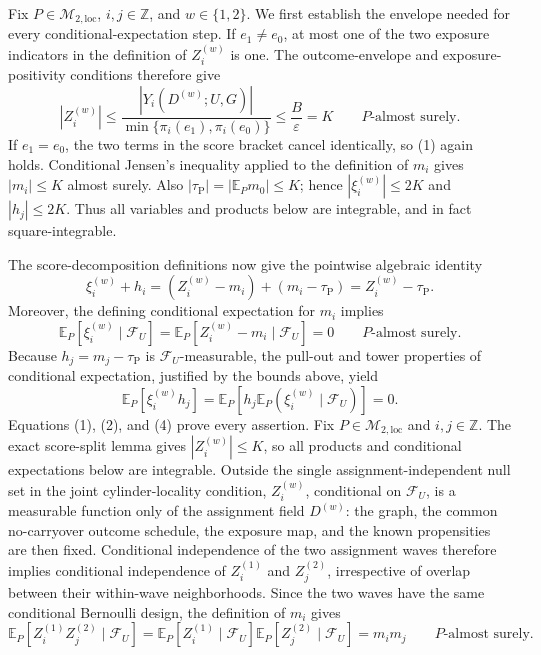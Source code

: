 Fix \(P\in\mathcal M_{2,\mathrm{loc}}\), \(i,j\in\mathbb Z\), and \(w\in\{1,2\}\).  We first establish the envelope needed for every conditional-expectation step.  If \(e_1\ne e_0\), at most one of the two exposure indicators in the definition of \(Z_i^{(w)}\) is one.  The outcome-envelope and exposure-positivity conditions therefore give
\[
 |Z_i^{(w)}|
 \le
 \frac{|Y_i(D^{(w)};U,G)|}
      {\min\{\pi_i(e_1),\pi_i(e_0)\}}
 \le \frac B\varepsilon=K
 \qquad P\text{-almost surely}. \tag{1}
\]
If \(e_1=e_0\), the two terms in the score bracket cancel identically, so (1) again holds.  Conditional Jensen's inequality applied to the definition of \(m_i\) gives \(|m_i|\le K\) almost surely.  Also \(|\tau_{\mathrm P}|=|\mathbb E_Pm_0|\le K\); hence \(|\xi_i^{(w)}|\le2K\) and \(|h_j|\le2K\).  Thus all variables and products below are integrable, and in fact square-integrable.

The score-decomposition definitions now give the pointwise algebraic identity
\[
 \xi_i^{(w)}+h_i
 =(Z_i^{(w)}-m_i)+(m_i-\tau_{\mathrm P})
 =Z_i^{(w)}-\tau_{\mathrm P}. \tag{2}
\]
Moreover, the defining conditional expectation for \(m_i\) implies
\[
 \mathbb E_P[\xi_i^{(w)}\mid\mathcal F_U]
 =\mathbb E_P[Z_i^{(w)}-m_i\mid\mathcal F_U]=0
 \qquad P\text{-almost surely}. \tag{3}
\]
Because \(h_j=m_j-\tau_{\mathrm P}\) is \(\mathcal F_U\)-measurable, the pull-out and tower properties of conditional expectation, justified by the bounds above, yield
\[
 \mathbb E_P[\xi_i^{(w)}h_j]
 =\mathbb E_P\!\left[
   h_j\mathbb E_P(\xi_i^{(w)}\mid\mathcal F_U)
 \right]
 =0. \tag{4}
\]
Equations (1), (2), and (4) prove every assertion.
Fix \(P\in\mathcal M_{2,\mathrm{loc}}\) and \(i,j\in\mathbb Z\).  The exact score-split lemma gives \(|Z_i^{(w)}|\le K\), so all products and conditional expectations below are integrable.  Outside the single assignment-independent null set in the joint cylinder-locality condition, \(Z_i^{(w)}\), conditional on \(\mathcal F_U\), is a measurable function only of the assignment field \(D^{(w)}\): the graph, the common no-carryover outcome schedule, the exposure map, and the known propensities are then fixed.  Conditional independence of the two assignment waves therefore implies conditional independence of \(Z_i^{(1)}\) and \(Z_j^{(2)}\), irrespective of overlap between their within-wave neighborhoods.  Since the two waves have the same conditional Bernoulli design, the definition of \(m_i\) gives
\[
 \mathbb E_P[Z_i^{(1)}Z_j^{(2)}\mid\mathcal F_U]
 =\mathbb E_P[Z_i^{(1)}\mid\mathcal F_U]
  \mathbb E_P[Z_j^{(2)}\mid\mathcal F_U]
 =m_im_j
 \qquad P\text{-almost surely}. \tag{1}
\]

